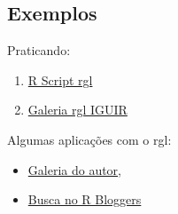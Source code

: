 \subsection*{Exemplos}

\begin{frame}

 Praticando:
  
  \begin{enumerate}
    \itemsep1pt\parskip0pt
  \item
    \href{run:./R/rgl/rgl.R}{R Script rgl}
  \item 
	\href{run:./rgl/RGL.html}{Galeria rgl IGUIR}
  \end{enumerate}

  Algumas aplicações com o rgl:
  \begin{itemize}
    \itemsep1pt\parskip0pt
  \item \href{http://cran.r-project.org/web/packages/rgl/vignettes/}{Galeria
      do autor},
  \item \href{http://www.r-bloggers.com/?s=rgl}{Busca no R
      Bloggers}
  \end{itemize}

\end{frame}
